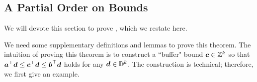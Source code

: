 \documentclass[runningheads]{llncs}
\begin{document}
\subsection{A Partial Order on Bounds}

We will devote this section to prove , which we restate here.



We need some supplementary definitions and lemmas to prove this theorem. 
The intuition of proving this theorem is to construct a ``buffer" bound $\boldsymbol c\in\mathbb Z^k$ so that $\boldsymbol a^\top\boldsymbol d\leq\boldsymbol c^\top\boldsymbol d\leq\boldsymbol b^\top\boldsymbol d$ holds for any $\boldsymbol d\in\mathbb D^k$. 
The construction is technical; therefore, we first give an example. 
\end{document}
